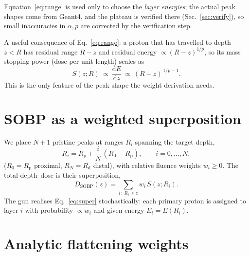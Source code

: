 \documentclass[11pt]{article}
\newcommand{\Rd}{R_{\mathrm d}}
\newcommand{\Rp}{R_{\mathrm p}}
\begin{document}
Equation~\eqref{eq:range} is used only to choose the \emph{layer energies}; the
actual peak shapes come from Geant4, and the plateau is verified there
(Sec.~\ref{sec:verify}), so small inaccuracies in $\alpha,p$ are corrected by
the verification step.

A useful consequence of Eq.~\eqref{eq:range}: a proton that has travelled to
depth $z<R$ has residual range $R-z$ and residual energy
$\propto (R-z)^{1/p}$, so its mass stopping power (dose per unit length) scales as
\begin{equation}
S(z;R)\ \propto\ \frac{\mathrm dE}{\mathrm dz}\ \propto\ (R-z)^{\,1/p-1}.
\label{eq:stop}
\end{equation}
This is the only feature of the peak shape the weight derivation needs.

\section{SOBP as a weighted superposition}

We place $N{+}1$ pristine peaks at ranges $R_i$ spanning the target depth,
\begin{equation}
R_i = \Rp + \frac{i}{N}\,(\Rd-\Rp),\qquad i=0,\dots,N,
\end{equation}
($R_0=\Rp$ proximal, $R_N=\Rd$ distal), with relative fluence weights $w_i\ge0$.
The total depth--dose is their superposition,
\begin{equation}
D_{\mathrm{SOBP}}(z)=\sum_{i\,:\,R_i\ge z} w_i\,S(z;R_i).
\label{eq:super}
\end{equation}
The gun realises Eq.~\eqref{eq:super} stochastically: each primary proton is
assigned to layer $i$ with probability $\propto w_i$ and given energy
$E_i=E(R_i)$.

\section{Analytic flattening weights}
\label{sec:weights}
\end{document}

